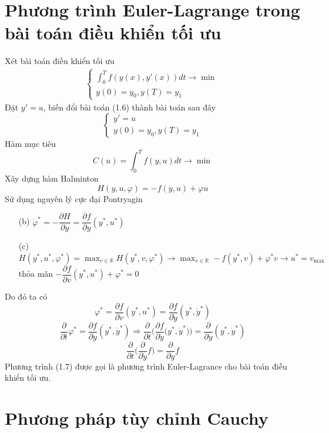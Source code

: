 \documentclass[12pt,a4paper]{report}
\begin{document}
\section{Phương trình Euler-Lagrange trong bài toán điều khiển tối ưu}
Xét bài toán điều khiển tối ưu \begin{eqnarray}
	\begin{cases}
		\int_{0}^{T}f(y(x), y'(x)) dt \to \min \\ y(0) = y_0, y(T) = y_1
	\end{cases}
\end{eqnarray} Đặt $y'=u$, biến đổi bài toán (1.6) thành bài toán sau đây $$\begin{cases}
y' = u\\y(0) = y_0, y(T) = y_1
\end{cases}$$ Hàm mục tiêu $$C(u) = \int_{0}^{T}f(y, u)dt \to
 \min$$ Xây dựng hàm Halminton $$H(y,u,\varphi) = -f(y,u) + \varphi u$$ Sử dụng nguyên lý cực đại Pontryagin \begin{itemize}
 	\item[(b)] $\dot{\varphi}^* = -\dfrac{\partial H}{\partial y} = \dfrac{\partial f}{\partial y}(y^*, u^*)$
 	\item[(c)] $H(y^*, u^*, \varphi^*) = \max_{v\in\mathbb{R}} H(y^*,v,\varphi^*) \to \max_{v \in \mathbb{R}} -f(y^*,v) + \varphi^*v \to u^* = v_{\max}$ thỏa mãn $-\dfrac{\partial f}{\partial v}(y^*,u^*) + \varphi^* = 0$
 \end{itemize}
Do đó ta có $$\varphi^* = \dfrac{\partial f}{\partial v}(y^*,u^*) = \dfrac{\partial f}{\partial \dot{y}}(y^*, \dot{y}^*)$$
$$\dfrac{\partial}{\partial t}\varphi^* = \dfrac{\partial f}{\partial y}(y^*, \dot{y}^*) \Rightarrow \dfrac{\partial}{\partial t}\Bigg(\dfrac{\partial f}{\partial \dot{y}}\big(y^*, \dot{y}^*\Big) \bigg) = \dfrac{\partial}{\partial y}(y^*, \dot{y}^*)$$
\begin{equation}
	\dfrac{\partial}{\partial t}\bigg(\dfrac{\partial}{\partial \dot{y}}f \bigg) = \dfrac{\partial}{\partial y}f
\end{equation} Phương trình (1.7) được gọi là phương trình Euler-Lagrance cho bài toán điều khiển tối ưu. 
\section{Phương pháp tùy chỉnh Cauchy}
\end{document}
